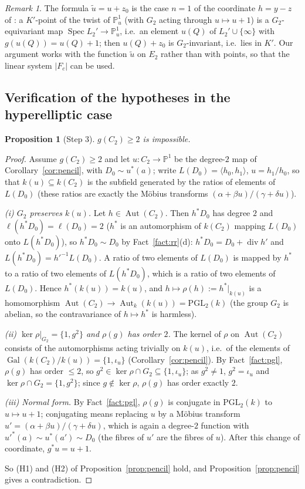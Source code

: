\documentclass[11pt]{amsart}
\newtheorem{proposition}[theorem]{Proposition}
\theoremstyle{definition}
\theoremstyle{remark}
\newtheorem{remark}[theorem]{Remark}
\newcommand{\PP}{\mathbb P}
\newcommand{\Aut}{\operatorname{Aut}}
\newcommand{\Spec}{\operatorname{Spec}}
\newcommand{\Gal}{\operatorname{Gal}}
\newcommand{\divv}{\operatorname{div}}
\newcommand{\ut}{\tilde u}
\begin{document}
\begin{remark}
The formula $\ut=u+z_0$ is the case $n=1$ of the coordinate $h=y-z$ of
\cite[Prop.~5.2(a)]{P}: a $K'$-point of the twist of $\PP^1_u$ (with $G_2$ acting through
$u\mapsto u+1$) is a $G_2$-equivariant map $\Spec L_2'\to\PP^1_u$, i.e.\ an element $u(Q)$
of $L_2'\cup\{\infty\}$ with $g(u(Q))=u(Q)+1$; then $u(Q)+z_0$ is $G_2$-invariant, i.e.\
lies in $K'$. Our argument works with the function $\ut$ on $E_2$ rather than with
points, so that the linear system $|F_c|$ can be used.
\end{remark}

\subsection{Verification of the hypotheses in the hyperelliptic case}

\begin{proposition}[Step 3]\label{prop:step3}
$g(C_2)\ge2$ is impossible.
\end{proposition}

\begin{proof}
Assume $g(C_2)\ge2$ and let $u\colon C_2\to\PP^1$ be the degree-$2$ map of
Corollary~\ref{cor:pencil}, with $D_0\sim u^*(a)$; write $L(D_0)=\langle h_0,h_1\rangle$,
$u=h_1/h_0$, so that $k(u)\subseteq k(C_2)$ is the subfield generated by the ratios of
elements of $L(D_0)$ (these ratios are exactly the M\"obius transforms $(\alpha+\beta u)/(\gamma+\delta u)$).

\emph{(i) $G_2$ preserves $k(u)$.} Let $h\in\Aut(C_2)$. Then $h^*D_0$ has degree $2$ and
$\ell(h^*D_0)=\ell(D_0)=2$ ($h^*$ is an automorphism of $k(C_2)$ mapping $L(D_0)$ onto
$L(h^*D_0)$), so $h^*D_0\sim D_0$ by Fact~\ref{fact:rr}(d): $h^*D_0=D_0+\divv h'$ and
$L(h^*D_0)=h'^{-1}L(D_0)$. A ratio of two elements of $L(D_0)$ is mapped by $h^*$ to a
ratio of two elements of $L(h^*D_0)$, which is a ratio of two elements of $L(D_0)$. Hence
$h^*(k(u))=k(u)$, and $h\mapsto\rho(h):=h^*|_{k(u)}$ is a homomorphism
$\Aut(C_2)\to\Aut_k(k(u))=\mathrm{PGL}_2(k)$ (the group $G_2$ is abelian, so the
contravariance of $h\mapsto h^*$ is harmless).

\emph{(ii) $\ker\rho|_{G_2}=\{1,g^2\}$ and $\rho(g)$ has order $2$.} The kernel of $\rho$
on $\Aut(C_2)$ consists of the automorphisms acting trivially on $k(u)$, i.e.\ of the
elements of $\Gal(k(C_2)/k(u))=\{1,\iota_u\}$ (Corollary~\ref{cor:pencil}). By
Fact~\ref{fact:pgl}, $\rho(g)$ has order $\le2$, so $g^2\in\ker\rho\cap G_2\subseteq\{1,\iota_u\}$;
as $g^2\ne1$, $g^2=\iota_u$ and $\ker\rho\cap G_2=\{1,g^2\}$; since $g\notin\ker\rho$,
$\rho(g)$ has order exactly $2$.

\emph{(iii) Normal form.} By Fact~\ref{fact:pgl}, $\rho(g)$ is conjugate in
$\mathrm{PGL}_2(k)$ to $u\mapsto u+1$; conjugating means replacing $u$ by a M\"obius
transform $u'=(\alpha+\beta u)/(\gamma+\delta u)$, which is again a degree-$2$ function
with $u'^*(a)\sim u^*(a')\sim D_0$ (the fibres of $u'$ are the fibres of $u$). After this
change of coordinate, $g^*u=u+1$.

So (H1) and (H2) of Proposition~\ref{prop:pencil} hold, and Proposition~\ref{prop:pencil}
gives a contradiction.
\end{proof}
\end{document}
